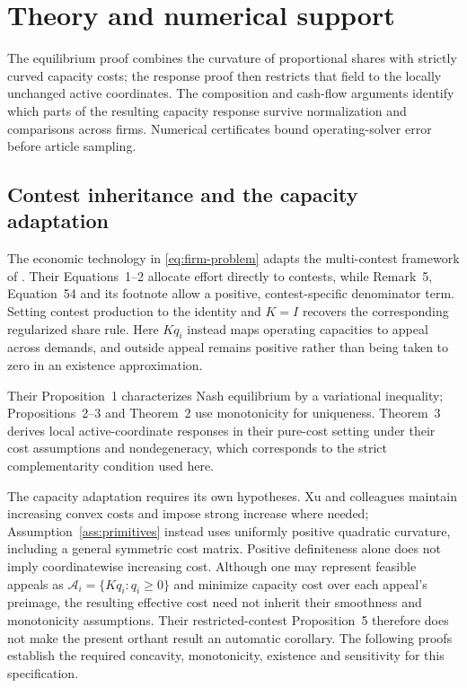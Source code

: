 \section{Theory and numerical support}\label{app:theory-support}

The equilibrium proof combines the curvature of proportional shares with
strictly curved capacity costs; the response proof then restricts that field
to the locally unchanged active coordinates.
The composition and cash-flow arguments identify which parts of the resulting
capacity response survive normalization and comparisons across firms.
Numerical certificates bound operating-solver error before article sampling.

\subsection{Contest inheritance and the capacity
adaptation}\label{app:contest-inheritance}

The economic technology in \eqref{eq:firm-problem} adapts the multi-contest
framework of \citet{xu_zenou_zhou_conflict_2022}.
Their Equations~1--2 allocate effort directly to contests, while Remark~5,
Equation~54 and its footnote allow a positive, contest-specific denominator
term.
Setting contest production to the identity and $K=I$ recovers the corresponding
regularized share rule.
Here $Kq_i$ instead maps operating capacities to appeal across demands, and
outside appeal remains positive rather than being taken to zero in an
existence approximation.

Their Proposition~1 characterizes Nash equilibrium by a variational
inequality; Propositions~2--3 and Theorem~2 use monotonicity for uniqueness.
Theorem~3 derives local active-coordinate responses in their pure-cost setting
under their cost assumptions and nondegeneracy,
which corresponds to the strict complementarity condition used here.

The capacity adaptation requires its own hypotheses.
Xu and colleagues maintain increasing convex costs and impose strong increase
where needed; Assumption~\ref{ass:primitives} instead uses uniformly positive
quadratic curvature, including a general symmetric cost matrix.
Positive definiteness alone does not imply coordinatewise increasing cost.
Although one may represent feasible appeals as
$\mathcal A_i=\{Kq_i:q_i\geq0\}$ and minimize capacity cost over each appeal's
preimage, the resulting effective cost need not inherit their smoothness and
monotonicity assumptions.
Their restricted-contest Proposition~5 therefore does not make the present
orthant result an automatic corollary.
The following proofs establish the required concavity, monotonicity,
existence and sensitivity for this specification.

